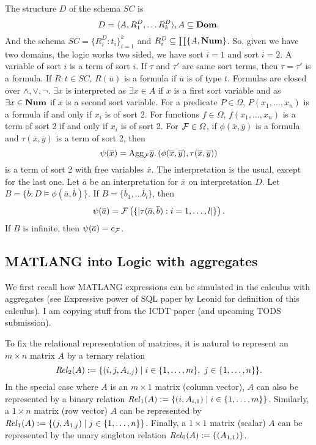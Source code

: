 The structure $D$ of the schema $SC$ is $$D=\langle A, R^D_1,\ldots R^D_k \rangle, A\subseteq \textbf{Dom}.$$ And the schema $SC=\lbrace R^D_i:t_i\rbrace_{i=1}^k$ and $R_i^D\subseteq\textstyle\prod\lbrace A,\textbf{Num}\rbrace$. So, given we have two domains, the logic works two sided, we have sort $i=1$ and sort $i=2$. A variable of sort $i$ is a term of sort $i$. If $\tau$ and $\tau'$ are same sort terms, then $\tau=\tau'$ is a formula. If $R:t\in SC$, $R(\overline{u})$ is a formula if $\overline{u}$ is of type $t$. Formulas are closed over $\wedge,\vee,\neg$. $\exists x$ is interpreted as $\exists x\in A$ if $x$ is a first sort variable and as $\exists x \in \textbf{Num}$ if $x$ is a second sort variable. For a predicate $P\in\Omega$, $P(x_1,\ldots,x_n)$ is a formula if and only if $x_i$ is of sort 2. For functions $f\in \varOmega$, $f(x_1,\ldots,x_n)$ is a term of sort 2 if and only if $x_i$ is of sort 2. For $\mathcal{F}\in\varOmega$, if $\phi (\overline{x}, \overline{y})$ is a formula and $\tau(\overline{x}, \overline{y})$ is a term of sort 2, then $$\psi(\overline{x})=\text{Agg}_{\mathcal{F}}\overline{y}.\left(\phi (\overline{x}, \overline{y}),  \tau(\overline{x}, \overline{y})\right)$$ is a term of sort 2 with free variables $\overline{x}$. The interpretation is the usual, except for the last one. Let $\overline{a}$ be an interpretation for $\overline{x}$ on interpretation $D$. Let $B=\lbrace \overline{b}:D\models \phi(\overline{a},\overline{b})\rbrace$. If $B=\lbrace\overline{b}_1,\ldots\overline{b}_l\rbrace$, then $$\psi(\overline{a})=\mathcal{F}\left(\lbrace\vert \tau(\overline{a}, \overline{b}):i=1,\ldots,l\vert\rbrace\right).$$ If $B$ is infinite, then $\psi (\overline{a})=c_{\mathcal{F}}$. 

\subsection{MATLANG into Logic with aggregates}
We first recall how MATLANG expressions can be simulated in the calculus with aggregates (see Expressive power of SQL paper by Leonid
for definition of this calculus). I am copying stuff from the ICDT paper (and upcoming TODS submission).

To fix the relational representation of matrices, it is natural to represent an $m \times n$ matrix $A$
by a ternary relation $$
\mathit{Rel}_2(A) := \{(i,j,A_{i,j}) \mid i \in \{1,\dots,m\}, \ j \in
\{1,\dots,n\}\}. $$  In the special case where $A$ is an
$m \times 1$ matrix (column
vector), $A$ can also be represented by a binary relation
$\mathit{Rel}_1(A) :=
\{(i,A_{i,1}) \mid i \in \{1,\dots,m\}\}$.  Similarly, a $1
\times n$ matrix (row vector) $A$ can be represented by $\mathit{Rel}_1(A)
:= \{(j,A_{1,j}) \mid j \in \{1,\dots,n\}\}$.  Finally, a $1
\times 1$ matrix (scalar) $A$ can be represented by the unary
singleton relation $\mathit{Rel}_0(A) := \{(A_{1,1})\}$. 

